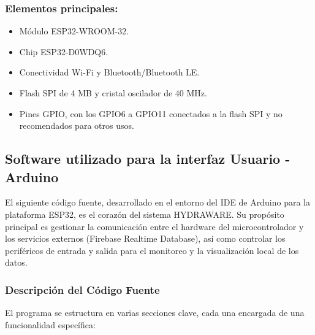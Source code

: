 \documentclass[a4paper,12pt]{article}
\begin{document}
	\subsubsection{Elementos principales:}
	\begin{itemize}
		\item Módulo ESP32-WROOM-32.
		
		\item Chip ESP32-D0WDQ6.
		
		\item Conectividad Wi-Fi y Bluetooth/Bluetooth LE.
		
		\item Flash SPI de 4 MB y cristal oscilador de 40 MHz.
		
		\item Pines GPIO, con los GPIO6 a GPIO11 conectados a la flash SPI y no recomendados para otros usos.
		
		
	\end{itemize}
	
	\subsection{Software utilizado para la interfaz Usuario - Arduino}
	El siguiente código fuente, desarrollado en el entorno del IDE de Arduino para la plataforma ESP32, es el corazón del sistema HYDRAWARE. Su propósito principal es gestionar la comunicación entre el hardware del microcontrolador y los servicios externos (Firebase Realtime Database), así como controlar los periféricos de entrada y salida para el monitoreo y la visualización local de los datos.
	
	\subsubsection{Descripción del Código Fuente}
	El programa se estructura en varias secciones clave, cada una encargada de una funcionalidad específica:
	
\end{document}

